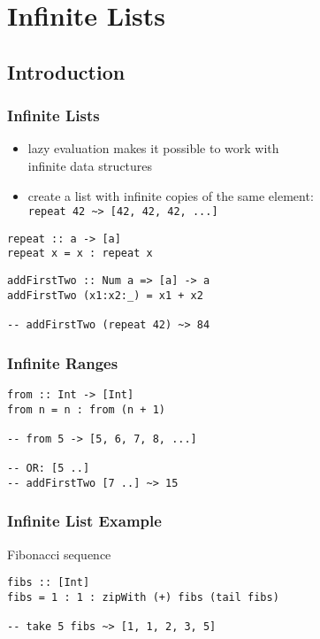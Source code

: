 \documentclass[dvipsnames]{beamer}
\theoremstyle{plain}
\begin{document}
\section{Infinite Lists}

\subsection{Introduction}

\begin{frame}[fragile]
  \frametitle{Infinite Lists}

  \begin{itemize}
    \item lazy evaluation makes it possible to work with\\
      infinite data structures
    \item create a list with infinite copies of the same element:\\
      \lstinline|repeat 42 ~> [42, 42, 42, ...]|
  \end{itemize}

  \begin{exampleblock}{}
    \begin{lstlisting}[deletekeywords={repeat}]
repeat :: a -> [a]
repeat x = x : repeat x
    \end{lstlisting}

    \pause
    \medskip
    \begin{lstlisting}
addFirstTwo :: Num a => [a] -> a
addFirstTwo (x1:x2:_) = x1 + x2

-- addFirstTwo (repeat 42) ~> 84
    \end{lstlisting}
  \end{exampleblock}
\end{frame}

\begin{frame}[fragile]
  \frametitle{Infinite Ranges}

  \begin{lstlisting}
from :: Int -> [Int]
from n = n : from (n + 1)

-- from 5 -> [5, 6, 7, 8, ...]

-- OR: [5 ..]
-- addFirstTwo [7 ..] ~> 15
  \end{lstlisting}
\end{frame}

\begin{frame}[fragile]
  \frametitle{Infinite List Example}

  \begin{exampleblock}{Fibonacci sequence}
    \begin{lstlisting}
fibs :: [Int]
fibs = 1 : 1 : zipWith (+) fibs (tail fibs)

-- take 5 fibs ~> [1, 1, 2, 3, 5]
    \end{lstlisting}


  \end{exampleblock}
\end{frame}
\end{document}
